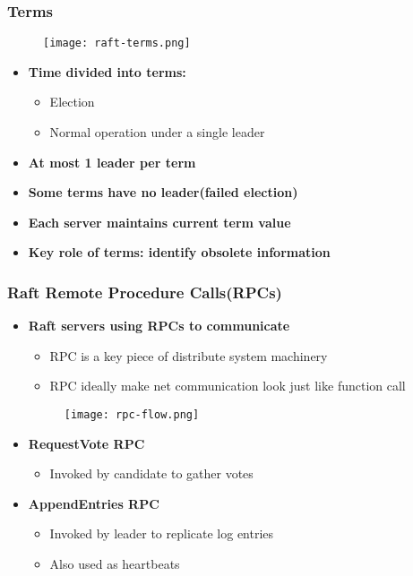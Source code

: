\begin{frame}
    \frametitle{Terms}
    \begin{figure}
        \centering
        \texttt{[image: raft-terms.png]}
    \end{figure}
    \begin{itemize}
        \item \textbf{Time divided into terms:}
            \begin{itemize}
                \item Election
                \item Normal operation under a single leader
            \end{itemize}
        \item \textbf{At most 1 leader per term}
        \item \textbf{Some terms have no leader(failed election)}
        \item \textbf{Each server maintains \alert{current term} value}
        \item \textbf{\alert{Key role of terms: identify obsolete information}}
    \end{itemize}
\end{frame}

\begin{frame}
    \frametitle{Raft Remote Procedure Calls(RPCs)}
    \begin{itemize}
        \item \textbf{Raft servers using RPCs to communicate}
            \begin{itemize}
                \item RPC is a key piece of distribute system machinery
                \item RPC ideally make net communication look just like function call
            \end{itemize}
        \begin{figure}
            \centering
            \texttt{[image: rpc-flow.png]}
        \end{figure}
        \item \textbf{RequestVote RPC}
            \begin{itemize}
                \item Invoked by candidate to gather votes
            \end{itemize}
        \item \textbf{AppendEntries RPC}
            \begin{itemize}
                \item Invoked by leader to replicate log entries
                \item Also used as heartbeats
            \end{itemize}
    \end{itemize}
\end{frame}

